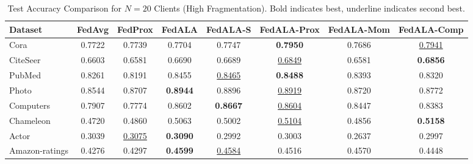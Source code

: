 \documentclass[10pt,conference,compsocconf,letterpaper]{IEEEtran}
\begin{document}
\begin{table}[t]
\centering
\caption{Test Accuracy Comparison for $N=20$ Clients (High Fragmentation). Bold indicates best, underline indicates second best.}
\label{tab:results_n20}
\begin{tabular}{@{}lccccccc@{}}
\toprule
\textbf{Dataset} & \textbf{FedAvg} & \textbf{FedProx} & \textbf{FedALA} & \textbf{FedALA-S} & \textbf{FedALA-Prox} & \textbf{FedALA-Mom} & \textbf{FedALA-Comp} \\ \midrule
Cora & 0.7722 & 0.7739 & 0.7704 & 0.7747 & \textbf{0.7950} & 0.7686 & \underline{0.7941} \\
CiteSeer & 0.6603 & 0.6581 & 0.6690 & 0.6689 & \underline{0.6849} & 0.6581 & \textbf{0.6856} \\
PubMed & 0.8261 & 0.8191 & 0.8455 & \underline{0.8465} & \textbf{0.8488} & 0.8393 & 0.8320 \\
Photo & 0.8544 & 0.8707 & \textbf{0.8944} & 0.8896 & \underline{0.8919} & 0.8720 & 0.8772 \\
Computers & 0.7907 & 0.7774 & 0.8602 & \textbf{0.8667} & \underline{0.8604} & 0.8447 & 0.8383 \\
Chameleon & 0.4720 & 0.4860 & 0.5063 & 0.5002 & \underline{0.5104} & 0.4856 & \textbf{0.5158} \\
Actor & 0.3039 & \underline{0.3075} & \textbf{0.3090} & 0.2992 & 0.3003 & 0.2637 & 0.2997 \\
Amazon-ratings & 0.4276 & 0.4297 & \textbf{0.4599} & \underline{0.4584} & 0.4516 & 0.4570 & 0.4448 \\ \bottomrule
\end{tabular}
\end{table}
\end{document}
